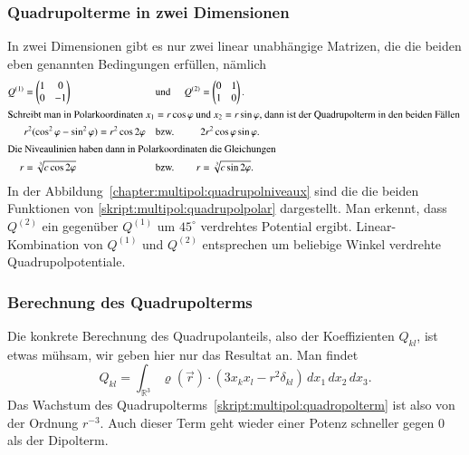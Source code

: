 \subsubsection{Quadrupolterme in zwei Dimensionen}
In zwei Dimensionen gibt es nur zwei linear unabhängige Matrizen, die die
beiden eben genannten Bedingungen erfüllen, nämlich
\begin{align}
Q^{(1)}&=\begin{pmatrix}1&0\\0&-1\end{pmatrix}
&&\text{und}&
Q^{(2)}&=\begin{pmatrix}0&1\\1&0\end{pmatrix}.
\label{skript:multipol:qmatrix}
\\
\intertext{%
Schreibt man in Polarkoordinaten $x_1=r\cos\varphi$ und $x_2=r\sin\varphi$,
dann ist der Quadrupolterm in den beiden Fällen
}
&r^2(\cos^2\varphi-\sin^2\varphi)=r^2\cos 2\varphi
&&\text{bzw.}&
&2r^2\cos\varphi\sin\varphi.
\notag
\\
\intertext{%
Die Niveaulinien haben dann in Polarkoordinaten die Gleichungen
}
r&=\sqrt[3]{c \cos2\varphi}
&&\text{bzw.}&
r&=\sqrt[3]{c \sin2\varphi}.
\label{skript:multipol:quadrupolpolar}
\end{align}
In der Abbildung~\ref{chapter:multipol:quadrupolniveaux} sind die die
beiden Funktionen von
\eqref{skript:multipol:quadrupolpolar} dargestellt.
Man erkennt, dass $Q^{(2)}$ ein gegenüber $Q^{(1)}$ um $45^\circ$ verdrehtes
Potential ergibt.
Linear-Kombination von $Q^{(1)}$ und $Q^{(2)}$ entsprechen um beliebige
Winkel verdrehte Quadrupolpotentiale.

\subsubsection{Berechnung des Quadrupolterms}
Die konkrete Berechnung des Quadrupolanteils, also der Koeffizienten
$Q_{kl}$, ist etwas mühsam, wir geben hier nur das Resultat an.
Man findet
\cite{skript:brandtdahmen}
\[
Q_{kl}
=
\int_{\mathbb R^3}
\varrho(\vec{r}) \cdot (3x_kx_l-r^2\delta_{kl})
\,dx_1\,dx_2\,dx_3.
\]
Das Wachstum des Quadrupolterms~\eqref{skript:multipol:quadropolterm}
ist also von der Ordnung $r^{-3}$.
Auch dieser Term geht wieder einer Potenz schneller gegen $0$ als der
Dipolterm.

